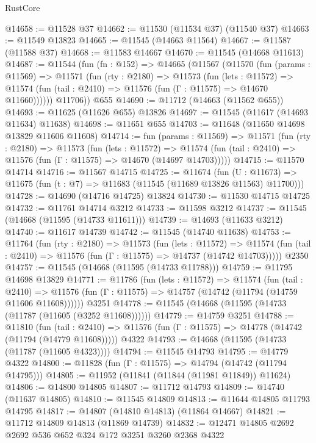 \begin{lexlean}{RustCore}
\begin{coremodule}
@14658 := @11528 @37
@14662 := @11530 (@11534 @37) (@11540 @37)
@14663 := @11549 @13823
@14665 := @11545 (@14663 @11564)
@14667 := @11587 (@11588 @37)
@14668 := @11583 @14667
@14670 := @11545 (@14668 @11613)
@14687 := @11544
    (fun (fn : @152) =>
    @14665
      (@11567
        (@11570
          (fun (params : @11569) =>
          @11571
            (fun (rty : @2180) =>
            @11573
              (fun (lets : @11572) =>
              @11574 (fun (tail : @2410) => @11576 (fun (Γ : @11575) => @14670 @11660))))))
        @11706))
    @655
@14690 := @11712 (@14663 (@11562 @655))
@14693 := @11625 (@11626 @655) @13826
@14697 := @11545 (@11617 (@14693 @11634) @11638)
@14698 := @11651 @655
@14703 := @11648 (@11650 @14698 @13829 @11606 @11608)
@14714 := fun (params : @11569) =>
  @11571
    (fun (rty : @2180) =>
    @11573
      (fun (lets : @11572) =>
      @11574 (fun (tail : @2410) => @11576 (fun (Γ : @11575) => @14670 (@14697 @14703)))))
@14715 := @11570 @14714
@14716 := @11567 @14715
@14725 := @11674
    (fun (U : @11673) => @11675 (fun (t : @7) => @11683 (@11545 (@11689 @13826 @11563) @11700)))
@14728 := @14690 (@14716 @14725) @13824
@14730 := @11530 @14715 @14725
@14732 := @11761 @14714 @3212
@14733 := @11598 @3212
@14737 := @11545 (@14668 (@11595 (@14733 @11611)))
@14739 := @14693 (@11633 @3212)
@14740 := @11617 @14739
@14742 := @11545 (@14740 @11638)
@14753 := @11764
    (fun (rty : @2180) =>
    @11573
      (fun (lets : @11572) =>
      @11574 (fun (tail : @2410) => @11576 (fun (Γ : @11575) => @14737 (@14742 @14703)))))
    @2350
@14757 := @11545 (@14668 (@11595 (@14733 @11788)))
@14759 := @11795 @14698 @13829
@14771 := @11786
    (fun (lets : @11572) =>
    @11574
      (fun (tail : @2410) =>
      @11576 (fun (Γ : @11575) => @14757 (@14742 (@11794 (@14759 @11606 @11608))))))
    @3251
@14778 := @11545 (@14668 (@11595 (@14733 (@11787 (@11605 (@3252 @11608))))))
@14779 := @14759 @3251
@14788 := @11810
    (fun (tail : @2410) => @11576 (fun (Γ : @11575) => @14778 (@14742 (@11794 (@14779 @11608)))))
    @4322
@14793 := @14668 (@11595 (@14733 (@11787 (@11605 @4323))))
@14794 := @11545 @14793
@14795 := @14779 @4322
@14800 := @11828 (fun (Γ : @11575) => @14794 (@14742 (@11794 @14795)))
@14805 := @11952 (@11841 (@11844 (@11981 @11849)) @11624)
@14806 := @14800 @14805
@14807 := @11712 @14793
@14809 := @14740 (@11637 @14805)
@14810 := @11545 @14809
@14813 := @11644 @14805 @11793 @14795
@14817 := @14807 (@14810 @14813) (@11864 @14667)
@14821 := @11712 @14809 @14813 (@11869 @14739)
@14832 := @12471 @14805 @2692 @2692 @536 @652 @324 @172 @3251 @3260 @2368 @4322

\end{coremodule}
\end{lexlean}
